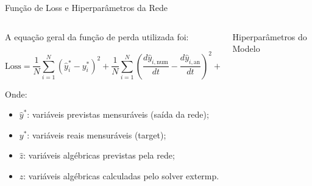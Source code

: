 \begin{frame}{Função de Loss e Hiperparâmetros da Rede}
    \begin{columns}[T]
        \begin{column}{0.55\textwidth}
            \footnotesize
            A equação geral da função de perda utilizada foi:

            \[
            \text{Loss} = \frac{1}{N} \sum_{i=1}^{N} (\hat{y}_i^* - y_i^*)^2
            + \frac{1}{N} \sum_{i=1}^{N} \left( \frac{d\hat{y}_{i,\text{num}}}{dt} - \frac{d\hat{y}_{i,\text{an}}}{dt} \right)^2
            + \frac{1}{N} \sum_{i=1}^{N} (\hat{z}_i - z_i)^2
            \]

            \vspace{0.2cm}
            Onde:
            \begin{itemize}
                \item \( \hat{y}^* \): variáveis previstas mensuráveis (saída da rede);
                \item \( y^* \): variáveis reais mensuráveis (target);
                \item \( \hat{z} \): variáveis algébricas previstas pela rede;
                \item \( z \): variáveis algébricas calculadas pelo solver extermp.
            \end{itemize}
        \end{column}

        \begin{column}{0.45\textwidth}
            \vspace{2cm}
            \begin{block}{\centering Hiperparâmetros do Modelo}
                \footnotesize
                \centering
            \end{block}
        \end{column}
    \end{columns}
\end{frame}